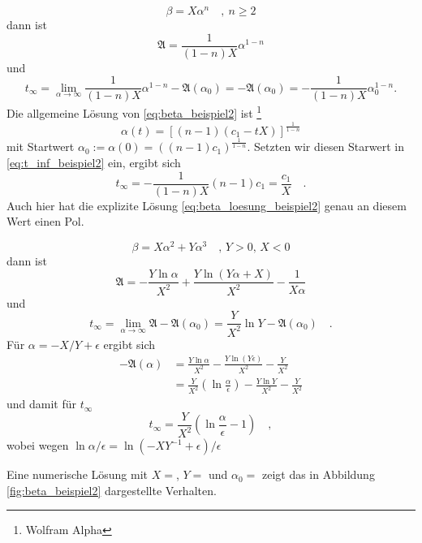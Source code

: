 		\begin{example}
			\begin{equation}
			\beta = X \alpha^n \quad , \ n\geq 2 
			\label{eq:beta_beispiel2}
			\end{equation}
			dann ist 
			\begin{equation}
			\mathfrak{A}= \frac{1}{(1-n)X} \alpha^{1-n}
			\end{equation}
			und 
			\begin{equation}
			t_\infty = \lim\limits_{\alpha\to\infty}
			\frac{1}{(1-n)X} \alpha^{1-n} - \mathfrak{A}(\alpha_0)
			=-\mathfrak{A}(\alpha_0)=-\frac{1}{(1-n)X} \alpha_0^{1-n}.
			\label{eq:t_inf_beispiel2} 
			\end{equation}
			Die allgemeine Lösung von \eqref{eq:beta_beispiel2} ist 
			\footnote{Wolfram Alpha}
			\begin{equation}
			\alpha(t) =\left[(n-1) (c_1-t X)\right]^\frac{1}{1-n} 
			\label{eq:beta_loesung_beispiel2}
			\end{equation}
			mit Startwert $\alpha_0:=\alpha(0)=\left((n-1)c_1\right)
			^\frac{1}{1-n}$. Setzten wir diesen Starwert in 
			\eqref{eq:t_inf_beispiel2} ein, ergibt sich
			\begin{equation}
			t_\infty = -\frac{1}{(1-n)X}(n-1)c_1 = \frac{c_1}{X} \quad. 
			\end{equation}
			Auch hier hat die explizite Lösung 
			\eqref{eq:beta_loesung_beispiel2} genau an diesem Wert 
			einen Pol.
		\end{example}		
		
		\begin{example}
			\begin{equation}
			\beta = X \alpha^2 + Y\alpha^3 \quad , \, Y>0,\, X<0
			\end{equation}
			dann ist 
			\begin{equation}
			\mathfrak{A}=-\frac{Y \ln \alpha}{X^2}+
			\frac{Y \ln(Y\alpha +X)}{X^2}-\frac{1}{X\alpha}
			\end{equation}
			und 
			\begin{equation}
			t_\infty = \lim\limits_{\alpha\to\infty}\mathfrak{A} 
			-\mathfrak{A}(\alpha_0)= 
			\frac{Y}{X^2}\ln Y-\mathfrak{A}(\alpha_0) \quad .			
			\end{equation}
			Für $\alpha=-X/Y+\epsilon$ ergibt sich			
			\begin{align}
			-\mathfrak{A}(\alpha)&=\frac{Y\ln \alpha}{X^2}
			-\frac{Y \ln(Y\epsilon)}{X^2}-\frac{Y}{X^2}		\\
			&= \frac{Y}{X^2}\left(\ln\frac{\alpha}{\epsilon}\right) 
			-\frac{Y \ln Y}{X^2}-\frac{Y}{X^2}
			\end{align}
			und damit für $t_\infty$
			\begin{equation}
			t_\infty = \frac{Y}{X^2}\left(  \ln \frac{\alpha}{
			\epsilon}-1\right) \quad ,
			\end{equation}			
			wobei wegen $\ln \alpha/\epsilon = \ln (-XY^{-1}+
			\epsilon)/\epsilon$			
			
			
			Eine numerische Lösung mit $X=$, $Y=$ und $\alpha_0=$ 
			zeigt das in Abbildung \ref{fig:beta_beispiel2} 
			dargestellte Verhalten.
		\end{example}
		


		
		
		

